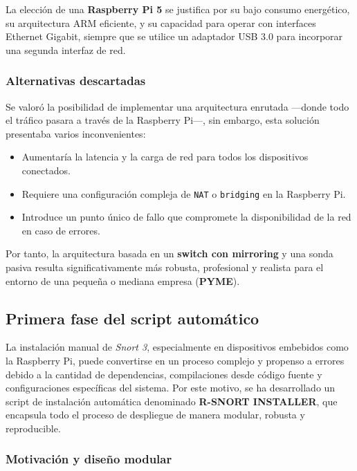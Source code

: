 \documentclass[11pt,a4paper,twoside]{report}
\begin{document}
La elección de una \textbf{Raspberry Pi 5} se justifica por su bajo consumo energético, su arquitectura ARM eficiente, y su capacidad para operar con interfaces Ethernet Gigabit, siempre que se utilice un adaptador USB 3.0 para incorporar una segunda interfaz de red.

\subsubsection{Alternativas descartadas}

Se valoró la posibilidad de implementar una arquitectura enrutada —donde todo el tráfico pasara a través de la Raspberry Pi—, sin embargo, esta solución presentaba varios inconvenientes:

\begin{itemize}
	\item Aumentaría la latencia y la carga de red para todos los dispositivos conectados.
	\item Requiere una configuración compleja de \texttt{NAT} o \texttt{bridging} en la Raspberry Pi.
	\item Introduce un punto único de fallo que compromete la disponibilidad de la red en caso de errores.
\end{itemize}

Por tanto, la arquitectura basada en un \textbf{switch con mirroring} y una sonda pasiva resulta significativamente más robusta, profesional y realista para el entorno de una pequeña o mediana empresa (\textbf{PYME}).


\subsection{Primera fase del script automático}
La instalación manual de \textit{Snort 3}, especialmente en dispositivos embebidos como la Raspberry Pi, puede convertirse en un proceso complejo y propenso a errores debido a la cantidad de dependencias, compilaciones desde código fuente y configuraciones específicas del sistema. Por este motivo, se ha desarrollado un script de instalación automática denominado \textbf{R-SNORT INSTALLER}, que encapsula todo el proceso de despliegue de manera modular, robusta y reproducible.

\subsubsection{Motivación y diseño modular}
\end{document}
